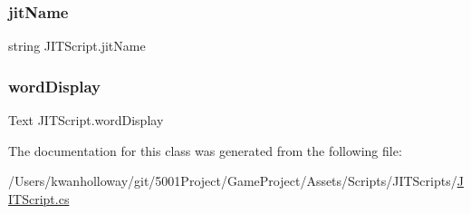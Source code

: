 \subsubsection{\texorpdfstring{jit\+Name}{jitName}}
{\footnotesize\ttfamily string J\+I\+T\+Script.\+jit\+Name}

\mbox{\label{class_j_i_t_script_a033821b78a287d85204d336682fc6ee2}} 
\subsubsection{\texorpdfstring{word\+Display}{wordDisplay}}
{\footnotesize\ttfamily Text J\+I\+T\+Script.\+word\+Display}



The documentation for this class was generated from the following file\+:\begin{DoxyCompactItemize}
\item 
/\+Users/kwanholloway/git/5001\+Project/\+Game\+Project/\+Assets/\+Scripts/\+J\+I\+T\+Scripts/\hyperlink{_j_i_t_script_8cs}{J\+I\+T\+Script.\+cs}\end{DoxyCompactItemize}
